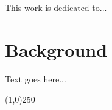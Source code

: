 \documentclass[12pt, a4paper, pdflatex, leqno, twoside]{report}
\newenvironment{dedication}
  {\clearpage               %
   \thispagestyle{empty}    %
   \vspace*{\stretch{1}}    %
   \itshape                 %
   \raggedright             %
   \par\setlength{\leftskip}{0.3\textwidth}\noindent\ignorespaces
  }
  {\par                     %
   \vspace{\stretch{3}}     %
   \clearpage               %
  }
\begin{document}
\newpage
\thispagestyle{empty}
\mbox{}

\begin{dedication}
This work is dedicated to...
\end{dedication}


\newpage
\thispagestyle{empty}
\mbox{}

\newpage{
  \thispagestyle{empty}
  \cleardoublepage
  \pagestyle{plain}
  \tableofcontents
  \thispagestyle{empty}
}

\newpage
\thispagestyle{empty}
\mbox{}


\chapter{Background\label{chp:introduction}}
\setcounter{page}{1}

Text goes here...

\begin{center}
\noindent \line(1,0){250}
\end{center}

{}

% 
\end{document}
